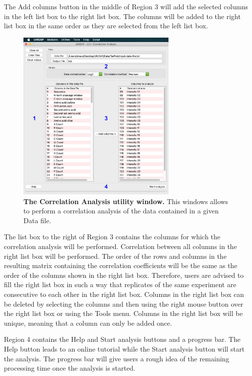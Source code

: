 The Add columns button in the middle of Region \num{3} will add the selected columns in the left list box to the right list box. The columns will be added to the right list box in the same order as they are selected from the left list box. 

\begin{figure}[h]
	\centering
	\includegraphics[width=0.7\textwidth]{./IMAGES/UTIL-CORR-WINDOW/util-corr.jpg}	    
	\caption[The Correlation Analysis utility window]{\textbf{The Correlation Analysis utility window.} This windows allows to perform a correlation analysis of the data contained in a given Data file.} 
	\label{fig:utilCorrAnalysis}
	\vspace{-5pt} 	
\end{figure}

The list box to the right of Region \num{3} contains the columns for which the correlation analysis will be performed. Correlation between all columns in the right list box will be performed. The  order of the rows and columns in the resulting matrix containing the correlation coefficients will be the same as the order of the columns shown in the right list box. Therefore, users are advised to fill the right list box in such a way that replicates of the same experiment are consecutive to each other in the right list box. Columns in the right list box can be deleted by selecting the columns and then using the right mouse button over the right list box or using the Tools menu. Columns in the right list box will be unique, meaning that a column can only be added once. 

Region \num{4} contains the Help and Start analysis buttons and a progress bar. The Help button leads to an online tutorial while the Start analysis button will start the analysis. The progress bar will give users a rough idea of the remaining processing time once the analysis is started.

